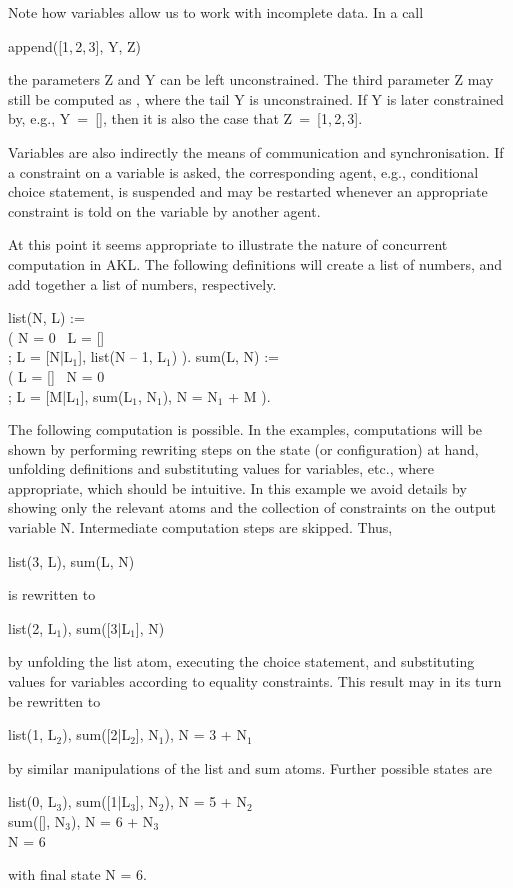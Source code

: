 Note how variables allow us to work with incomplete data.  In a call
%
\begin{progex}
append([1,\,2,\,3], Y, Z)
\end{progex}%
%
the parameters {\prog Z} and {\prog Y} can be left unconstrained.  The
third parameter {\prog Z} may still be computed as {\prog
[1,\,2,\,3|Y]}, where the tail {\prog Y} is unconstrained.  If {\prog
Y} is later constrained by, e.g., {\prog Y~=~[]}, then it is also the
case that {\prog Z~=~[1,\,2,\,3]}.

Variables are also indirectly the means of communication and
synchronisation.  If a constraint on a variable is asked, the
corresponding agent, e.g., conditional choice statement, is suspended
and may be restarted whenever an appropriate constraint is told on the
variable by another agent.

At this point it seems appropriate to illustrate the nature of
concurrent computation in AKL.  The following definitions will create a
list of numbers, and add together a list of numbers, respectively.
%
\begin{program}
list(N, L) := \\
\>\>( N = 0 \cond\ L = [] \\
\>\>; L = [N|L$_1$], list(N -- 1, L$_1$) ).  \nl
sum(L, N) := \\
\>\>( L = [] \cond\ N = 0 \\
\>\>; L = [M|L$_1$], sum(L$_1$, N$_1$), N = N$_1$ + M ).
\end{program}%
%
The following computation is possible.  In the examples, computations
will be shown by performing rewriting steps on the state (or
configuration) at hand, unfolding definitions and substituting values
for variables, etc., where appropriate, which should be intuitive.  In
this example we avoid details by showing only the relevant atoms and
the collection of constraints on the output variable {\prog N}.
Intermediate computation steps are skipped.  Thus,
%
\begin{progex}
list(3, L), sum(L, N)
\end{progex}%
%
is rewritten to
%
\begin{progex}
list(2, L$_1$), sum([3|L$_1$], N)
\end{progex}%
%
by unfolding the {\prog list} atom, executing the choice statement,
and substituting values for variables according to equality
constraints.  This result may in its turn be rewritten to
%
\begin{progex}
list(1, L$_2$), sum([2|L$_2$], N$_1$), N = 3 + N$_1$
\end{progex}%
%
by similar manipulations of the {\prog list} and {\prog sum} atoms.
Further possible states are
%
\begin{progex}
list(0, L$_3$), sum([1|L$_3$], N$_2$), N = 5 + N$_2$ \\
sum([], N$_3$), N = 6 + N$_3$ \\
N = 6
\end{progex}%
%
with final state N = 6.


